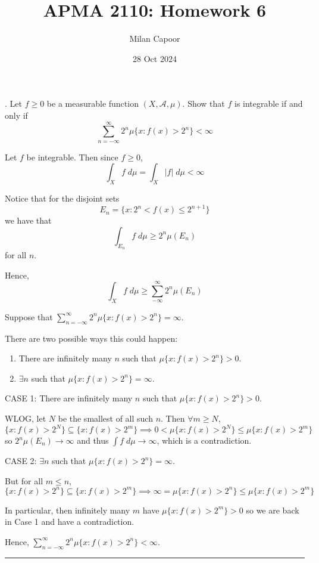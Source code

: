 \documentclass[12pt]{article}
\title{APMA 2110: Homework 6}
\author{Milan Capoor}
\date{28 Oct 2024}
\newcommand{\abs}[1]{\left\vert #1 \right\vert}
\newcommand{\A}{\mathcal{A}}
\newcommand{\sub}{\subseteq}
\renewcommand{\div}{\vspace*{10pt}\hrule\vspace*{10pt}}
\begin{document}
. Let $f \geq 0$ be a measurable function $(X, \A, \mu)$. Show that $f$ is integrable
if and only if 
\[\sum_{n=-\infty}^{\infty} 2^n \mu\{x: f(x) > 2^n\} < \infty\]

    \color{blue}
        Let $f$ be integrable. Then since $f \geq 0$,
        \[\int_X f \; d\mu = \int_X \abs{f} \; d\mu < \infty\] 

        Notice that for the disjoint sets 
        \[E_n = \{x: 2^n < f(x) \leq 2^{n+1}\}\]
        we have that 
        \[\int_{E_n} f \; d\mu \geq 2^n \mu(E_n) \]
        for all $n$. 

        Hence, 
        \[\int_X f \; d\mu \geq \sum_{-\infty}^{\infty} 2^n\mu(E_n)\]

        Suppose that $\sum_{n=-\infty}^{\infty} 2^n \mu\{x: f(x) > 2^n\} = \infty$. 

        There are two possible ways this could happen:
        \begin{enumerate}
            \item There are infinitely many $n$ such that $\mu\{x: f(x) > 2^n\} > 0$. 
            \item $\exists n$ such that $\mu\{x: f(x) > 2^n\} = \infty$.
        \end{enumerate}

        CASE 1: There are infinitely many $n$ such that $\mu\{x: f(x) > 2^n\} > 0$. 

        WLOG, let $N$ be the smallest of all such $n$. Then $\forall m\geq N$, 
        \[\{x: f(x) > 2^N\} \sub \{x: f(x) > 2^m\} \implies 0 < \mu\{x: f(x) > 2^N\} \leq \mu\{x: f(x) > 2^m\}\]
        so $2^n \mu(E_n) \to \infty$ and thus $\int f \; d\mu \to \infty$, which is a contradiction. 

        CASE 2: $\exists n$ such that $\mu\{x: f(x) > 2^n\} = \infty$. 

        But for all $m \leq n$, 
        \[\{x: f(x) > 2^n\} \sub \{x: f(x) > 2^m\} \implies \infty = \mu\{x: f(x) > 2^n\} \leq \mu\{x: f(x) > 2^m\}\]
        
        In particular, then infinitely many $m$ have $\mu\{x: f(x) > 2^m\} > 0$ so we are back in Case 1 and have a contradiction.

        Hence, $\sum_{n=-\infty}^{\infty} 2^n \mu\{x: f(x) > 2^n\} < \infty$.

        \div 
\end{document}

